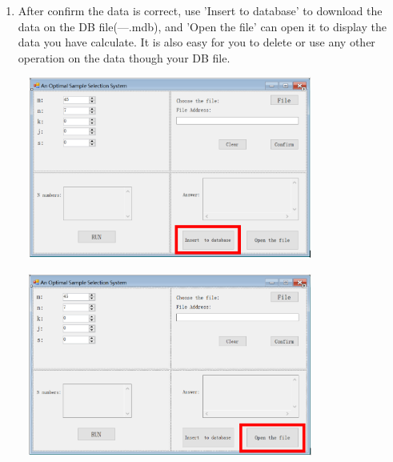 \begin{enumerate}
\item After confirm the data is correct, use 'Insert to database' to download the data on the DB file(---.mdb), and 'Open the file' can open it to display the data you have calculate. It is also easy for you to delete or use any other operation on the data though your DB file.
\begin{center}
    \includegraphics[width=10cm,height=6cm]{images/step5.PNG}
\end{center}
\begin{center}
    \includegraphics[width=10cm,height=6cm]{images/step6.PNG}
\end{center}

\end{enumerate}